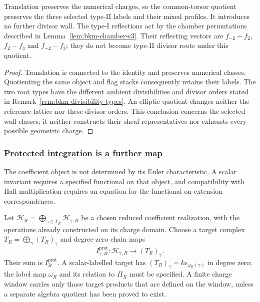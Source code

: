 \begin{proposition}
\label{prop:type-ii-walls-survive-e-quotient}
\label{prop:no-type-i-wall-enters-hybrid-carrier}
Translation preserves the numerical charges, so the common-torsor
quotient preserves the three selected type-II labels and their
mixed profiles. It introduces no further divisor wall. The
type-I reflections act by the chamber permutations described in
Lemma~\ref{lem:bkm-chamber-s3}. Their reflecting vectors are
$f_{-2}-f_2$, $f_2-f_3$ and $f_{-2}-f_3$; they do not become type-II
divisor roots under this quotient.
\end{proposition}

\begin{proof}
Translation is connected to the identity and preserves numerical
classes. Quotienting the same object and flag stacks consequently
retains their labels. The two root types have the different
ambient divisibilities and divisor orders stated in
Remark~\ref{rem:bkm-divisibility-types}. An elliptic quotient
changes neither the reference lattice nor these divisor orders.
This conclusion concerns the selected wall classes; it neither
constructs their sheaf representatives nor exhausts every
possible geometric charge.
\end{proof}


\subsubsection*{Protected integration is a further map}

The coefficient object is not determined by its Euler
characteristic. A scalar invariant requires a specified functional
on that object, and compatibility with Hall multiplication requires
an equation for the functional on extension correspondences.

\begin{definition}
\label{def:finite-protected-integration-datum}
Let $\mathcal H_R=\bigoplus_{\gamma\in\Gamma_R}\mathcal H_{\gamma,R}$
be a chosen reduced coefficient realization, with the operations
already constructed on its charge domain. Choose a target complex
$T_R=\bigoplus_\gamma(T_R)_\gamma$ and degree-zero chain maps
\[
 I_{\gamma,R}^{\mathrm{prot}}:
 \mathcal H_{\gamma,R}\longrightarrow(T_R)_\gamma.
\]
Their sum is $I_R^{\mathrm{prot}}$. A scalar-labelled target has
$(T_R)_\gamma=k e_{\omega_R(\gamma)}$ in degree zero; the label
map $\omega_R$ and its relation to $\overline\Pi_X$ must be
specified. A finite charge window carries only those target
products that are defined on the window, unless a separate
algebra quotient has been proved to exist.
\end{definition}

